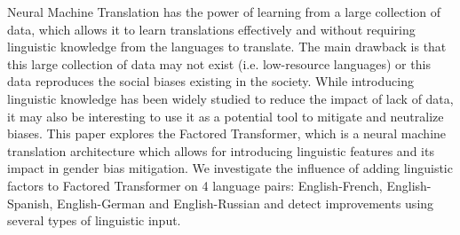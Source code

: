 Neural Machine Translation has the power of learning from a large collection of data, which allows it to learn translations effectively and without requiring linguistic knowledge from the languages to translate. The main drawback is that this large collection of data may not exist (i.e. low-resource languages) or this data reproduces the social biases existing in the society. While introducing linguistic knowledge has been widely studied to reduce the impact of lack of data, it may also be interesting to use it as a potential tool to mitigate and neutralize biases. This paper explores the Factored Transformer, which is a neural machine translation architecture which allows for introducing linguistic features and its impact in gender bias mitigation. We investigate the influence of adding linguistic factors to Factored Transformer on 4 language pairs: English-French, English-Spanish, English-German and English-Russian and detect improvements using several types of linguistic input.
